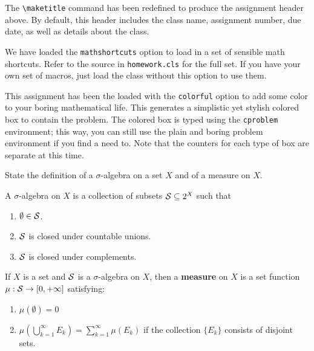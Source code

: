 \documentclass[mathshortcuts, colorful]{homework}
\begin{document}
		\maketitle 

		\noindent The \verb|\maketitle| command has been redefined to produce the assignment header above. By default, this header includes the class name, assignment number, due date, as well as details about the class. \bigbreak 

		\noindent We have loaded the \texttt{mathshortcuts} option to load in a set of sensible math shortcuts. Refer to the source in \texttt{homework.cls} for the full set. If you have your own set of macros, just load the class without this option to use them. \bigbreak

		\noindent This assignment has been the loaded with the \texttt{colorful} option to add some color to your boring mathematical life. This generates a simplistic yet stylish colored box to contain the problem. The colored box is typed using the \texttt{cproblem} environment; this way, you can still use the plain and boring problem environment if you find a need to. Note that the counters for each type of box are separate at this time.
		
		\begin{cproblem}
				State the definition of a $\sigma$-algebra on a set $X$ and of a measure on $X$.
		\end{cproblem}
		\begin{soln}
				A $\sigma$-algebra on $X$ is a collection of subsets $\mathcal{S} \subseteq 2^X$ such that 
				\begin{enumerate}
						\item $\emptyset \in \mathcal{S}$. 
						\item $\mathcal{S}$ is closed under countable unions. 
						\item $\mathcal{S}$ is closed under complements.
				\end{enumerate}
				If $X$ is a set and $\mathcal{S}$ is a $\sigma$-algebra on $X$, then a \textbf{measure} on $X$ is a set function $\mu : \mathcal{S} \to [0, +\infty]$ satisfying: 
				\begin{enumerate}
						\item $\mu(\emptyset) = 0$ 
						\item $\mu \left( \bigcup_{k=1}^{\infty} E_k \right) = \sum_{k=1}^{\infty} \mu(E_k)$ if the collection $\{E_k\}$ consists of disjoint sets.
				\end{enumerate}
		\end{soln}
\end{document}
